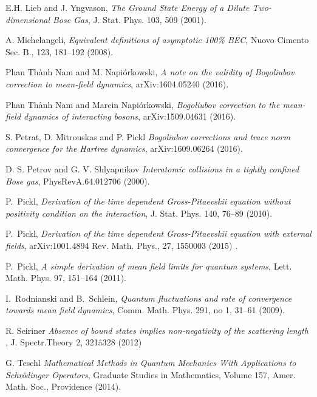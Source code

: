 \documentclass[11pt, english, american]{article}
\begin{document}
\begin{thebibliography}{}
E.H. Lieb and J. Yngvason, 
\emph{ The Ground State Energy of a Dilute Two- dimensional Bose Gas}, J. Stat. Phys. 103, 509 (2001).







A. Michelangeli, \emph{Equivalent definitions of asymptotic 100\% BEC}, Nuovo Cimento Sec. B.,  123, 181--192 (2008).

Phan Th\`anh Nam and M. Napi\'orkowski,
\emph{A note on the validity of Bogoliubov correction to mean-field dynamics},
arXiv:1604.05240 (2016).

Phan Th\`anh Nam and Marcin Napi\'orkowski,
\emph{Bogoliubov correction to the mean-field dynamics of interacting bosons},
arXiv:1509.04631 (2016).

S. Petrat, D. Mitrouskas and P. Pickl
\emph{Bogoliubov corrections and trace norm convergence for
the Hartree dynamics}, arXiv:1609.06264 (2016).

D. S. Petrov and G. V. Shlyapnikov
\emph{ Interatomic collisions in a tightly confined Bose gas}, 
PhysRevA.64.012706 (2000).


P.~Pickl, \emph{Derivation of the time dependent Gross-Pitaevskii equation without positivity condition on the interaction}, J. Stat. Phys. 140, 76--89 (2010).


P.~Pickl, \emph{Derivation of the time dependent Gross-Pitaevskii equation with external fields},  arXiv:1001.4894 Rev. Math. Phys., 27, 1550003 (2015) .



P.~Pickl, \emph{A simple  derivation of mean field limits for quantum systems}, Lett. Math. Phys. 97, 151--164 (2011).




I.~Rodnianski and B.~Schlein, \emph{Quantum fluctuations and rate of
  convergence towards mean field dynamics}, Comm. Math. Phys.  291, no 1, 31--61 (2009).

R. Seiriner \emph{Absence of bound states implies non-negativity of the scattering length
}, J. Spectr.Theory 2, 321â328 (2012)

G. Teschl \emph{Mathematical Methods in Quantum Mechanics
With Applications to Schr\"odinger Operators},
Graduate Studies in Mathematics, Volume 157, Amer. Math. Soc., Providence (2014).




\end{thebibliography}
\end{document}
